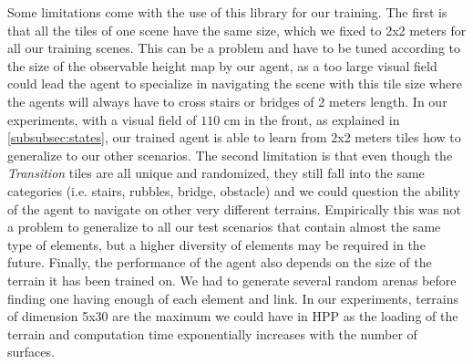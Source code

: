 Some limitations come with the use of this library for our training.
The first is that all the tiles of one scene have the same size, which we fixed to 2x2 meters for all our training scenes. 
This can be a problem and have to be tuned according to the size of the observable height map by our agent, as a too large visual field could lead the agent to specialize in navigating the scene with this tile size where the agents will always have to cross stairs or bridges of 2 meters length. 
In our experiments, with a visual field of $110$ cm in the front, as explained in \ref{subsubsec:states}, our trained agent is able to learn from 2x2 meters tiles how to generalize to our other scenarios.
The second limitation is that even though the \textit{Transition} tiles are all unique and randomized, they still fall into the same categories (i.e. stairs, rubbles, bridge, obstacle) and we could question the ability of the agent to navigate on other very different terrains. Empirically this was not a problem to generalize to all our test scenarios that contain almost the same type of elements, but a higher diversity of elements may be required in the future.
Finally, the performance of the agent also depends on the size of the terrain it has been trained on. We had to generate several random arenas before finding one having enough of each element and link. 
In our experiments, terrains of dimension 5x30 are the maximum we could have in HPP as the loading of the terrain and computation time exponentially increases with the number of surfaces.

